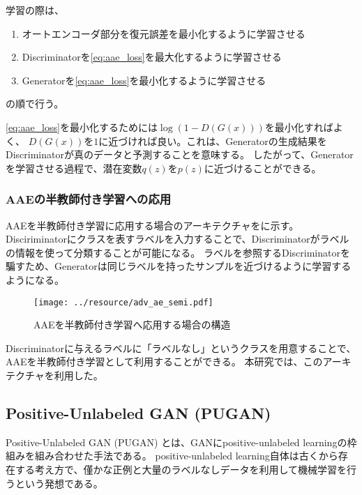 学習の際は、
\begin{enumerate}
    \item オートエンコーダ部分を復元誤差を最小化するように学習させる
    \item Discriminatorを\eqref{eq:aae_loss}を最大化するように学習させる
    \item Generatorを\eqref{eq:aae_loss}を最小化するように学習させる
\end{enumerate}
の順で行う。

\eqref{eq:aae_loss}を最小化するためには$\log(1-D(G(x)))$を最小化すればよく、
$D(G(x))$を$1$に近づければ良い。これは、Generatorの生成結果をDiscriminatorが真のデータと予測することを意味する。
したがって、Generatorを学習させる過程で、潜在変数$q(z)$を$p(z)$に近づけることができる。

\subsubsection{AAEの半教師付き学習への応用}

AAEを半教師付き学習に応用する場合のアーキテクチャをに示す。
Disciriminatorにクラスを表すラベルを入力することで、Discriminatorがラベルの情報を使って分類することが可能になる。
ラベルを参照するDiscriminatorを騙すため、Generatorは同じラベルを持ったサンプルを近づけるように学習するようになる。
\begin{figure}[tbp]
    \centering
    \texttt{[image: ../resource/adv\_ae\_semi.pdf]}
    \caption{AAEを半教師付き学習へ応用する場合の構造\cite{aae}} \label{fig:adv_ae_semi}
\end{figure}

Discriminatorに与えるラベルに「ラベルなし」というクラスを用意することで、AAEを半教師付き学習として利用することができる。
本研究では、このアーキテクチャを利用した。

\subsection{Positive-Unlabeled GAN (PUGAN)} \label{pugan}

Positive-Unlabeled GAN (PUGAN) \cite{pugan}とは、GANにpositive-unlabeled learningの枠組みを組み合わせた手法である。
positive-unlabeled learning自体は古くから存在する考え方で、僅かな正例と大量のラベルなしデータを利用して機械学習を行うという発想である。

